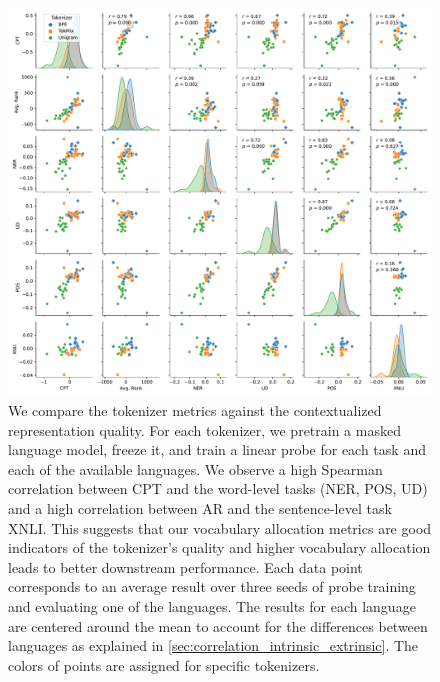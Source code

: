 




\begin{figure}
    \centering
    \includegraphics[width=\textwidth]{figures/pair_analysis_20L.pdf}
    \caption{We compare the tokenizer metrics against the contextualized representation quality. For each tokenizer, we pretrain a masked language model, freeze it, and train a linear probe for each task and each of the available languages. We observe a high Spearman correlation between CPT and the word-level tasks (NER, POS, UD) and a high correlation between AR and the sentence-level task XNLI. This suggests that our vocabulary allocation metrics are good indicators of the tokenizer's quality and higher vocabulary allocation leads to better downstream performance. Each data point corresponds to an average result over three seeds of probe training and evaluating one of the languages. The results for each language are centered around the mean to account for the differences between languages as explained in \autoref{sec:correlation_intrinsic_extrinsic}. The colors of points are assigned for specific tokenizers.}
    \label{fig:pair_analysis_20L}
\end{figure}

